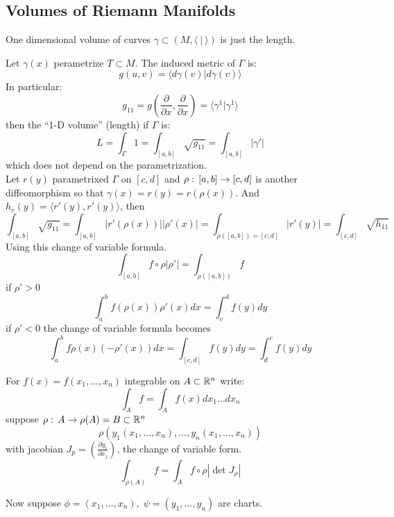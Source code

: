 \subsection{Volumes of Riemann Manifolds}
\begin{examples}
One dimensional volume of curves $\gamma\subset (M,\langle\ |\ \rangle)$ is just the length.
\end{examples}
Let $\gamma(x)$ perametrize $T\subset M$. The induced metric of $\Gamma$ is:
$$g(u,v) = \langle d\gamma(v) | d\gamma(v) \rangle $$
In particular:
$$g_{11}= g\left(\frac{\partial}{\partial x},\frac{\partial}{\partial x}\right) = \langle\gamma^1|\gamma^1 \rangle$$
then the ``1-D volume'' (length) if $\Gamma$ is:
$$L= \int_\Gamma 1 = \int_{[a,b]} \sqrt{g_11} = \int_{[a,b]} |\gamma'|$$
which does not depend on the parametrization.\\
Let $r(y)$ parametrixed $\Gamma$ on $[c,d]$ and $\rho:\, [a,b] \to [c,d]$ is another diffeomorphism so that $\gamma(x) = r(y) = r(\rho(x))$. And $h_v(y)=\langle r'(y),r'(y) \rangle$, then 
$$\int_{[a,b]} \sqrt{g_{11}} = \int_{[a,b]} |r'(\rho(x))||\rho'(x)|=\int_{\rho([a,b]) = [c,d]} |r'(y)| = \int_{[c,d]} \sqrt{h_{11}}$$
Using this change of variable formula.
$$\int_{[a,b]} f\circ \rho|\rho'| = \int_{\rho([a,b])}f$$
if $\rho'>0$
$$\int_a^b f(\rho(x))\rho'(x) dx = \int_c^d f(y) dy$$
if $\rho'<0$ the change of variable formula becomes
$$\int_a^b f\rho(x) (-\rho'(x)) dx = \int_{[c,d]} f(y) dy = \int_d^c f(y) dy$$
\begin{ddef}[Volume of $(M,g)$]
For $f(x) = f(x_1,\ldots ,x_n) $ integrable on $A\subset \mathbb{R}^n$ write:
$$\int_A f= \int_Af(x) dx_1 \ldots dx_n$$
suppose $\rho:\, A\to \rho(A) = B\subset \mathbb{R}^n$ 
$$\rho(y_1(x_1,\ldots,x_n), \ldots, y_n(x_1,\ldots, x_n))$$
 with jacobian $J_p = \left( \frac{\partial y_i}{\partial  x_j} \right)$, the change of variable form.
$$\int_{\rho(A)} f = \int_A f\circ \rho |\det J_\rho |$$
\end{ddef}
Now suppose $\phi = (x_1,\ldots, x_n),\; \psi = (y_1,\ldots, y_n)$ are charts.

